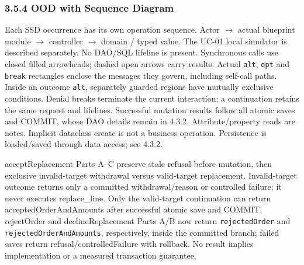 \subsubsection*{3.5.4 OOD with Sequence Diagram}
Each SSD occurrence has its own operation sequence. Actor \ensuremath{\rightarrow} actual blueprint module \ensuremath{\rightarrow} controller \ensuremath{\rightarrow} domain / typed value. The UC-01 local simulator is described separately. No DAO/SQL lifeline is present. Synchronous calls use closed filled arrowheads; dashed open arrows carry results. Actual \texttt{alt}, \texttt{opt} and \texttt{break} rectangles enclose the messages they govern, including self-call paths. Inside an outcome \texttt{alt}, separately guarded regions have mutually exclusive conditions. Denial breaks terminate the current interaction; a continuation retains the same request and lifelines. Successful mutation results follow all atomic saves and COMMIT, whose DAO details remain in 4.3.2. Attribute/property reads are notes. Implicit dataclass \guillemotleft{}create\guillemotright{} is not a business operation. Persistence is loaded/saved through data access; see 4.3.2.

acceptReplacement Parts A--C preserve stale refusal before mutation, then exclusive invalid-target withdrawal versus valid-target replacement. Invalid-target outcome returns only a committed withdrawal/reason or controlled failure; it never executes replace\_line. Only the valid-target continuation can return acceptedOrderAndAmounts after successful atomic save and COMMIT. rejectOrder and declineReplacement Parts A/B now return \texttt{rejectedOrder} and \texttt{rejectedOrderAndAmounts}, respectively, inside the committed branch; failed saves return refusal/controlledFailure with rollback. No result implies implementation or a measured transaction guarantee.

